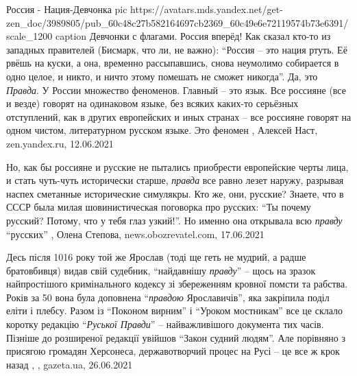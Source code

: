 Россия - Нация-Девчонка
\ifcmt
	pic https://avatars.mds.yandex.net/get-zen_doc/3989805/pub_60c48c27b582164697cb2369_60c49e6e72119574b73e6391/scale_1200
  caption Девчонки с флагами. Россия вперёд!
\fi
Как сказал кто-то из западных правителей (Бисмарк, что ли, не важно):
\enquote{Россия -- это нация ртуть. Её рвёшь на куски, а она, временно
рассыпавшись, снова неумолимо собирается в одно целое, и никто, и ничто этому
помешать не сможет никогда}. Да, это \emph{Правда}. У России множество
феноменов. Главный -- это язык.  Все россияне (все и везде) говорят на
одинаковом языке, без всяких каких-то серьёзных отступлений, как в других
европейских и иных странах -- все россияне говорят на одном чистом,
литературном русском языке. Это феномен
, 
Алексей Наст, zen.yandex.ru, 12.06.2021

Но, как бы россияне и русские не пытались приобрести европейские черты лица, и
стать чуть-чуть исторически старше, \emph{правда} все равно лезет наружу, разрывая
наспех сметанные исторические симулякры.  Кто же, они, русские?  Знаете, что в
СССР была милая шовинистическая поговорка про русских: \enquote{Ты почему русский?
Потому, что у тебя глаз узкий!}. Но именно она открывала всю \emph{правду} \enquote{русских}
, 
Олена Степова, news.obozrevatel.com, 17.06.2021


Десь після 1016 року той же Ярослав (тоді ще геть не мудрий, а радше
братовбивця) видав свій судебник, \enquote{найдавнішу \emph{правду}} – щось на зразок
найпростішого кримінального кодексу зі збереженням кровної помсти та рабства.
Років за 50 вона була доповнена \enquote{\emph{правдою} Ярославичів}, яка закріпила поділ
еліти і плебсу. Разом із \enquote{Поконом вирним} і \enquote{Уроком мостникам} все це склало
коротку редакцію \enquote{\emph{Руської Правди}} – найважливішого документа тих часів. Пізніше
до розширеної редакції увійшов \enquote{Закон судний людям}.  Але порівняно з присягою
громадян Херсонеса, державотворчий процес на Русі – це все ж крок назад
, 
, gazeta.ua, 26.06.2021

